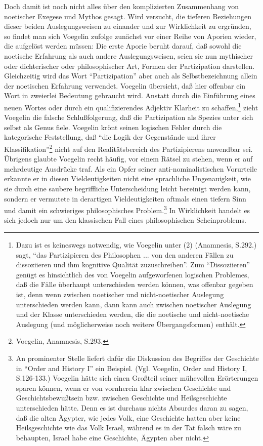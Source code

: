 Doch damit ist noch nicht alles über den komplizierten Zusammenhang von
noetischer Exegese und Mythos gesagt. Wird versucht, die tieferen
Beziehungen dieser beiden Auslegungsweisen zu einander und zur
Wirklichkeit zu ergründen, so findet man sich Voegelin zufolge zunächst
vor einer Reihe von Aporien wieder, die aufgelöst werden müssen: Die
erste Aporie beruht darauf, daß sowohl die noetische Erfahrung als auch
andere Auslegungsweisen, seien sie nun mythischer oder dichterischer
oder philosophischer Art, Formen der Partizipation darstellen.
Gleichzeitig wird das Wort "`Partizipation"' aber auch als
Selbstbezeichnung allein der noetischen Erfahrung verwendet.  Voegelin
übersieht, daß hier offenbar ein Wort in zweierlei Bedeutung gebraucht
wird. Anstatt durch die Einführung eines neuen Wortes oder durch ein
qualifizierendes Adjektiv Klarheit zu schaffen,\footnote{Dazu ist es
  keineswegs notwendig, wie Voegelin unter (2) (Anamnesis, S.292.) sagt,
  "`das Partizipieren des Philosophen ... von den anderen Fällen zu
  dissoziieren und ihm kognitive Qualität zuzuschreiben"'.  Zum
  "`Dissoziieren"' genügt es hinsichtlich des von Voegelin aufgeworfenen
  logischen Problemes, daß die Fälle überhaupt unterschieden werden
  können, was offenbar gegeben ist, denn wenn zwischen noetischer und
  nicht-noetischer Auslegung unterschieden werden kann, dann kann auch
  zwischen noetischer Auslegung und der Klasse unterschieden werden, die
  die noetische und nicht-noetische Auslegung (und möglicherweise noch
  weitere Übergangsformen) enthält.} zieht Voegelin die falsche
Schlußfolgerung, daß die Partizipation als Spezies unter sich selbst als
Genus fiele. Voegelin krönt seinen logischen Fehler durch die
kategorische Feststellung, daß "`die Logik der Gegenstände und ihrer
Klassifikation"'\footnote{Voegelin, Anamnesis, S.293.}  nicht auf den
Realitätsbereich des Partizipierens anwendbar sei. Übrigens glaubte
Voegelin recht häufig, vor einem Rätsel zu stehen, wenn er auf
mehrdeutige Ausdrücke traf. Als ein Opfer seiner anti-nominalistischen
Vorurteile erkannte er in diesen Vieldeutigkeiten nicht eine sprachliche
Ungenauigkeit, wie sie durch eine saubere begriffliche Unterscheidung
leicht bereinigt werden kann, sondern er vermutete in derartigen
Vieldeutigkeiten oftmals einen tiefern Sinn und damit ein schwieriges
philosophisches Problem.\footnote{An prominenter Stelle liefert dafür
  die Diskussion des Begriffes der Geschichte in "`Order and History I"'
  ein Beispiel. (Vgl. Voegelin, Order and History I, S.126-133.)
  Voegelin hätte sich einen Großteil seiner mühevollen Erörterungen
  sparen können, wenn er von vornherein klar zwischen Geschichte und
  Geschichtsbewußtsein bzw. zwischen Geschichte und Heilsgeschichte
  unterschieden hätte. Denn es ist durchaus nichts Absurdes daran zu
  sagen, daß die alten Ägypter, wie jedes Volk, eine Geschichte hatten
  aber keine Heilsgeschichte wie das Volk Israel, während es in der Tat
  falsch wäre zu behaupten, Israel habe eine Geschichte, Ägypten aber
  nicht.} In Wirklichkeit handelt es sich jedoch nur um den klassischen
Fall eines philosophischen Scheinproblems.

